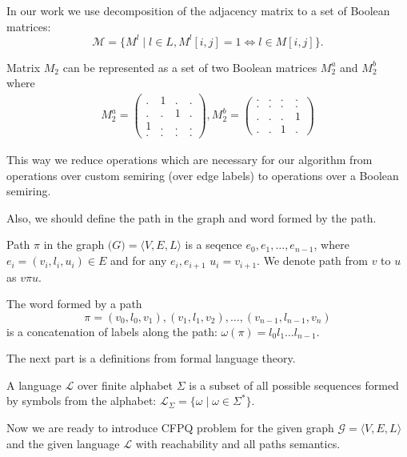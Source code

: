In our work we use decomposition of the adjacency matrix to a set of Boolean matrices: 
$$
\mathcal{M} = \{M^l \mid l \in L, M^l[i,j]=1 \iff l \in M[i,j]\}.
$$

Matrix $M_2$ can be represented as a set of two Boolean matrices $M_2^a$ and $M_2^b$ where
\begin{align}
M_2^{a} =
\begin{pmatrix}
    . & 1 & . & .   \\
    . & . & 1 & .   \\
    1 & . & . & .   \\
    . & . & . & .  
\end{pmatrix}, 
M_2^{b} =
\begin{pmatrix}      
    . & . & . & .   \\
    . & . & . & .   \\
    . & . & . & 1   \\
    . & . & 1 & . 
\end{pmatrix} \label{eq:boolean_decomposition_of_graph}
\end{align}


This way we reduce operations which are necessary for our algorithm from operations over custom semiring (over edge labels) to operations over a Boolean semiring.

Also, we should define the path in the graph and word formed by the path.

\begin{definition}
Path $\pi$ in the graph $\mathcal(G) = \langle V,E,L \rangle$ is a seqence $e_0,e_1,\ldots,e_{n-1}$, where $e_i = (v_i,l_i,u_i) \in E$ and for any $e_i, e_{i+1}$ $u_i = v_{i+1}$. We denote path from $v$ to $u$ as $v\pi u$.   
\end{definition}

\begin{definition}
The word formed by a path $$\pi = (v_0,l_0,v_1),(v_1,l_1,v_2),\ldots,(v_{n-1},l_{n-1},v_n)$$ is a concatenation of labels along the path: $\omega(\pi) = l_0 l_1 \ldots l_{n-1}$.
\end{definition}

The next part is a definitions from formal language theory.
\begin{definition}
A language $\mathcal{L}$ over finite alphabet $\Sigma$ is a subset of all possible sequences formed by symbols from the alphabet: $\mathcal{L}_{\Sigma} = \{\omega \mid \omega \in \Sigma^*\}$.
\end{definition}

Now we are ready to introduce CFPQ problem for the given graph  $\mathcal{G} = \langle V,E,L \rangle$ and the given language $\mathcal{L}$ with reachability and all paths semantics.

